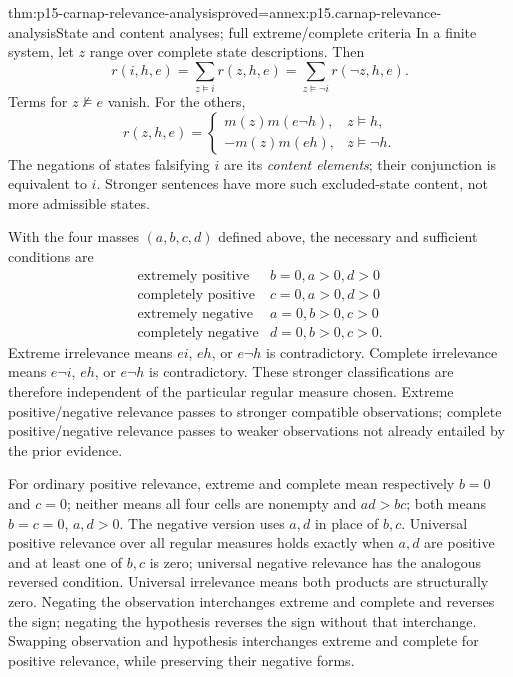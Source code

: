\begin{hbtheorem}{thm:p15-carnap-relevance-analysis}{proved=annex:p15.carnap-relevance-analysis}{State and content analyses; full extreme/complete criteria}
In a finite system, let \(z\) range over complete state descriptions.
Then
\[
 r(i,h,e)=\sum_{z\models i}r(z,h,e)
          =\sum_{z\models\neg i}r(\neg z,h,e).
\]
Terms for \(z\not\models e\) vanish. For the others,
\[
 r(z,h,e)=
 \begin{cases}
 m(z)m(e\neg h),&z\models h,\\
 -m(z)m(eh),&z\models\neg h.
 \end{cases}
\]
The negations of states falsifying \(i\) are its \emph{content
elements}; their conjunction is equivalent to \(i\). Stronger
sentences have more such excluded-state content, not more admissible
states.

With the four masses \((a,b,c,d)\) defined above, the necessary and
sufficient conditions are
\[
\begin{array}{c|c}
 \text{extremely positive}&b=0, a>0, d>0\\
 \text{completely positive}&c=0, a>0, d>0\\
 \text{extremely negative}&a=0, b>0, c>0\\
 \text{completely negative}&d=0, b>0, c>0.
\end{array}
\]
Extreme irrelevance means \(ei\), \(eh\), or \(e\neg h\) is
contradictory. Complete irrelevance means \(e\neg i\), \(eh\),
or \(e\neg h\) is contradictory. These stronger classifications
are therefore independent of the particular regular measure chosen.
Extreme positive/negative relevance passes to stronger compatible
observations; complete positive/negative relevance passes to weaker
observations not already entailed by the prior evidence.

For ordinary positive relevance, extreme and complete mean respectively
\(b=0\) and \(c=0\); neither means all four cells are nonempty
and \(ad>bc\); both means \(b=c=0\), \(a,d>0\).
The negative version uses \(a,d\) in place of \(b,c\).
Universal positive relevance over all regular measures holds exactly
when \(a,d\) are positive and at least one of \(b,c\) is zero;
universal negative relevance has the analogous reversed condition.
Universal irrelevance means both products are structurally zero.
Negating the observation interchanges extreme and complete and reverses
the sign; negating the hypothesis reverses the sign without that
interchange. Swapping observation and hypothesis interchanges extreme
and complete for positive relevance, while preserving their negative
forms.
\end{hbtheorem}

